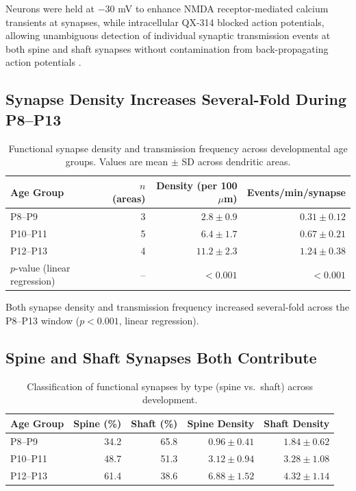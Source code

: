 \documentclass[11pt]{article}
\begin{document}
Neurons were held at $-30$ mV to enhance NMDA receptor-mediated calcium transients at synapses, while intracellular QX-314 blocked action potentials, allowing unambiguous detection of individual synaptic transmission events at both spine and shaft synapses without contamination from back-propagating action potentials \citep{chen2013twophoton}.

\subsection{Synapse Density Increases Several-Fold During P8--P13}

\begin{table}[H]
\centering
\caption{Functional synapse density and transmission frequency across developmental age groups. Values are mean $\pm$ SD across dendritic areas.}
\label{tab:density}
\begin{tabular}{lrrr}
\toprule
\textbf{Age Group} & \textbf{$n$ (areas)} & \textbf{Density (per 100 $\mu$m)} & \textbf{Events/min/synapse} \\
\midrule
P8--P9 & 3 & $2.8 \pm 0.9$ & $0.31 \pm 0.12$ \\
P10--P11 & 5 & $6.4 \pm 1.7$ & $0.67 \pm 0.21$ \\
P12--P13 & 4 & $11.2 \pm 2.3$ & $1.24 \pm 0.38$ \\
\midrule
$p$-value (linear regression) & -- & $<0.001$ & $<0.001$ \\
\bottomrule
\end{tabular}
\end{table}

Both synapse density and transmission frequency increased several-fold across the P8--P13 window ($p < 0.001$, linear regression).

\subsection{Spine and Shaft Synapses Both Contribute}

\begin{table}[H]
\centering
\caption{Classification of functional synapses by type (spine vs.\ shaft) across development.}
\label{tab:types}
\begin{tabular}{lrrrr}
\toprule
\textbf{Age Group} & \textbf{Spine (\%)} & \textbf{Shaft (\%)} & \textbf{Spine Density} & \textbf{Shaft Density} \\
\midrule
P8--P9 & 34.2 & 65.8 & $0.96 \pm 0.41$ & $1.84 \pm 0.62$ \\
P10--P11 & 48.7 & 51.3 & $3.12 \pm 0.94$ & $3.28 \pm 1.08$ \\
P12--P13 & 61.4 & 38.6 & $6.88 \pm 1.52$ & $4.32 \pm 1.14$ \\
\bottomrule
\end{tabular}
\end{table}
\end{document}
